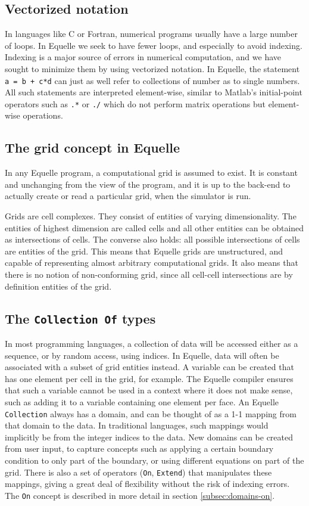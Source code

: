 \documentclass[11pt]{article}
\newcommand{\code}[1]{\texttt{#1}}
\begin{document}
\subsection{Vectorized notation}

In languages like C or Fortran, numerical programs usually have a large number of
loops. In Equelle we seek to have fewer loops, and especially to avoid indexing. Indexing
is a major source of errors in numerical computation, and we have sought to minimize them
by using vectorized notation. In Equelle, the statement \code{a = b + c*d} can just as
well refer to collections of number as to single numbers. All such statements are
interpreted element-wise, similar to Matlab's initial-point operators such as
\code{.*} or \code{./} which do not perform matrix operations but element-wise
operations.

\subsection{The grid concept in Equelle}

In any Equelle program, a computational grid is assumed to exist. It is constant and
unchanging from the view of the program, and it is up to the back-end to actually
create or read a particular grid, when the simulator is run.

Grids are cell complexes. They consist of entities of varying dimensionality. The entities
of highest dimension are called cells and all other entities can be obtained as
intersections of cells. The converse also holds: all possible intersections of cells are
entities of the grid. This means that Equelle grids are unstructured, and capable of
representing almost arbitrary computational grids. It also means that there is no notion
of non-conforming grid, since all cell-cell intersections are by definition entities of
the grid.

\subsection{The \code{Collection Of} types}

In most programming languages, a collection of data will be accessed either as a sequence,
or by random access, using indices. In Equelle, data will often be associated with a
subset of grid entities instead. A variable can be created that has one element per cell
in the grid, for example. The Equelle compiler ensures that such a variable cannot be used
in a context where it does not make sense, such as adding it to a variable containing one
element per face. An Equelle \code{Collection} always has a domain, and can be thought of
as a 1-1 mapping from that domain to the data. In traditional languages, such mappings
would implicitly be from the integer indices to the data. New domains can be created from
user input, to capture concepts such as applying a certain boundary condition to only part
of the boundary, or using different equations on part of the grid. There is also a set of
operators (\code{On}, \code{Extend}) that manipulates these mappings, giving a great deal
of flexibility without the risk of indexing errors. The \code{On} concept is described in more
detail in section \ref{subsec:domains-on}.
\end{document}
